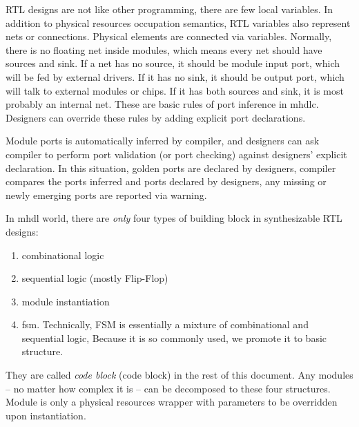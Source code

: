 
RTL designs are not like other programming, there are few local
variables.  In addition to physical resources occupation semantics,
RTL variables also represent nets or connections. Physical elements
are connected via variables. Normally, there is no floating net inside
modules, which means every net should have sources and sink. If a net has no
source, it should be module input port, which will be fed by external drivers. 
If it has no sink, it should be output port, which will talk to external 
modules or chips.  If it has both sources and sink, it is most probably
an internal net. These are basic rules of port inference
in \gls{mhdlc}. Designers can override these rules by adding explicit
port declarations.

Module ports is automatically inferred by compiler, and designers
can ask compiler to perform port validation (or port
checking) against designers' explicit declaration. In this situation,
golden ports are declared by designers, compiler compares the ports
inferred and ports declared by designers, any missing or newly
emerging ports are reported via warning.


In \gls{mhdl} world, there are \emph{only} four types of building block
in synthesizable RTL designs: 
\begin{enumerate}
\item combinational logic
\item sequential logic (mostly Flip-Flop)
\item module instantiation
\item \gls{fsm}. Technically, FSM is
essentially a mixture of combinational and sequential logic, Because
it is so commonly used, we promote it to basic structure.
\end{enumerate}
They are
called \emph{code block} (\gls{code block}) in the rest of this
document. Any modules -- no matter how complex it is -- can be
decomposed to these four structures. Module is only a physical
resources wrapper with parameters to be overridden upon instantiation.

